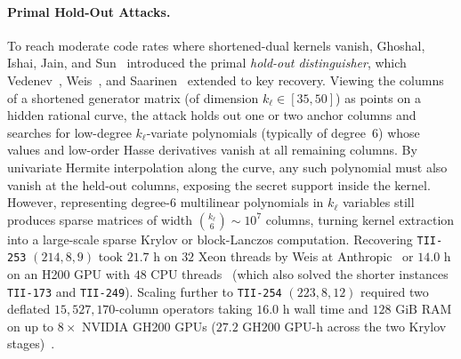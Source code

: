 \documentclass[11pt,a4paper]{article}
\theoremstyle{definition}
\theoremstyle{remark}
\begin{document}
\paragraph{Primal Hold-Out Attacks.}
To reach moderate code rates where shortened-dual kernels vanish, Ghoshal, Ishai, Jain, and Sun~\cite{GIJS26} introduced the primal \emph{hold-out distinguisher}, which Vedenev~\cite{Ved26}, Weis~\cite{Wei26}, and Saarinen~\cite{Saa26b} extended to key recovery. Viewing the columns of a shortened generator matrix (of dimension $k_\ell \in [35, 50]$) as points on a hidden rational curve, the attack holds out one or two anchor columns and searches for low-degree $k_\ell$-variate polynomials (typically of degree~$6$) whose values and low-order Hasse derivatives vanish at all remaining columns. By univariate Hermite interpolation along the curve, any such polynomial must also vanish at the held-out columns, exposing the secret support inside the kernel. However, representing degree-$6$ multilinear polynomials in $k_\ell$ variables still produces sparse matrices of width $\binom{k_\ell}{6} \sim 10^7$ columns, turning kernel extraction into a large-scale sparse Krylov or block-Lanczos computation. Recovering \texttt{TII-253} $(214, 8, 9)$ took $21.7\text{ h}$ on $32$ Xeon threads by Weis at Anthropic~\cite{Wei26} or $14.0\text{ h}$ on an H200 GPU with $48$ CPU threads~\cite{Ved26} (which also solved the shorter instances \texttt{TII-173} and \texttt{TII-249}). Scaling further to \texttt{TII-254} $(223, 8, 12)$ required two deflated $15{,}527{,}170$-column operators taking $16.0\text{ h}$ wall time and $128\text{ GiB}$ RAM on up to $8\times$ NVIDIA GH200 GPUs ($27.2\text{ GH200 GPU-h}$ across the two Krylov stages)~\cite{Saa26b,SaaRepo}.
\end{document}
